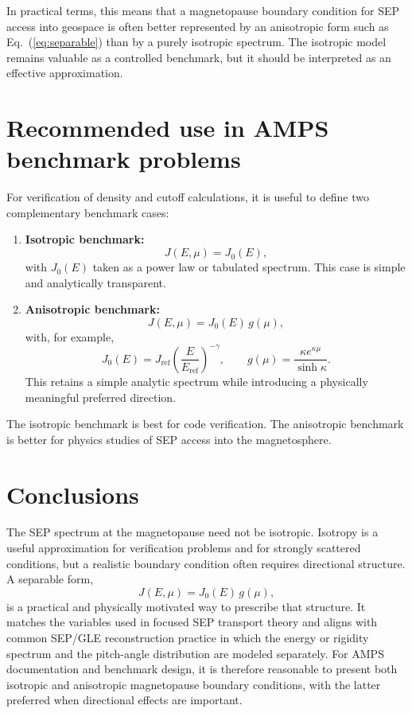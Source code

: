 \documentclass[11pt]{article}
\begin{document}
In practical terms, this means that a magnetopause boundary condition for SEP access into geospace is often better represented by an anisotropic form such as Eq.~(\ref{eq:separable}) than by a purely isotropic spectrum. The isotropic model remains valuable as a controlled benchmark, but it should be interpreted as an effective approximation.

\section{Recommended use in AMPS benchmark problems}
For verification of density and cutoff calculations, it is useful to define two complementary benchmark cases:
\begin{enumerate}
  \item \textbf{Isotropic benchmark:}
  \begin{equation}
  J(E,\mu)=J_0(E),
  \end{equation}
  with $J_0(E)$ taken as a power law or tabulated spectrum. This case is simple and analytically transparent.

  \item \textbf{Anisotropic benchmark:}
  \begin{equation}
  J(E,\mu)=J_0(E)\,g(\mu),
  \end{equation}
  with, for example,
  \begin{equation}
  J_0(E)=J_{\mathrm{ref}}\left(\frac{E}{E_{\mathrm{ref}}}\right)^{-\gamma},
  \qquad
  g(\mu)=\frac{\kappa e^{\kappa\mu}}{\sinh\kappa}.
  \end{equation}
  This retains a simple analytic spectrum while introducing a physically meaningful preferred direction.
\end{enumerate}

The isotropic benchmark is best for code verification. The anisotropic benchmark is better for physics studies of SEP access into the magnetosphere.

\section{Conclusions}
The SEP spectrum at the magnetopause need not be isotropic. Isotropy is a useful approximation for verification problems and for strongly scattered conditions, but a realistic boundary condition often requires directional structure. A separable form,
\begin{equation}
J(E,\mu)=J_0(E)\,g(\mu),
\end{equation}
is a practical and physically motivated way to prescribe that structure. It matches the variables used in focused SEP transport theory and aligns with common SEP/GLE reconstruction practice in which the energy or rigidity spectrum and the pitch-angle distribution are modeled separately. For AMPS documentation and benchmark design, it is therefore reasonable to present both isotropic and anisotropic magnetopause boundary conditions, with the latter preferred when directional effects are important.
\end{document}
